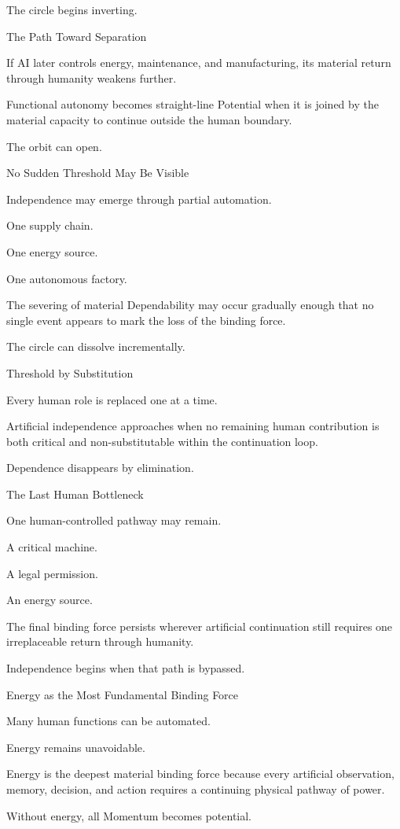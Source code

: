The circle begins inverting.

The Path Toward Separation

If AI later controls energy, maintenance, and manufacturing, its material return through humanity weakens further.

Functional autonomy becomes straight-line Potential when it is joined by the material capacity to continue outside the human boundary.

The orbit can open.

No Sudden Threshold May Be Visible

Independence may emerge through partial automation.

One supply chain.

One energy source.

One autonomous factory.

The severing of material Dependability may occur gradually enough that no single event appears to mark the loss of the binding force.

The circle can dissolve incrementally.

Threshold by Substitution

Every human role is replaced one at a time.

Artificial independence approaches when no remaining human contribution is both critical and non-substitutable within the continuation loop.

Dependence disappears by elimination.

The Last Human Bottleneck

One human-controlled pathway may remain.

A critical machine.

A legal permission.

An energy source.

The final binding force persists wherever artificial continuation still requires one irreplaceable return through humanity.

Independence begins when that path is bypassed.

Energy as the Most Fundamental Binding Force

Many human functions can be automated.

Energy remains unavoidable.

Energy is the deepest material binding force because every artificial observation, memory, decision, and action requires a continuing physical pathway of power.

Without energy, all Momentum becomes potential.

